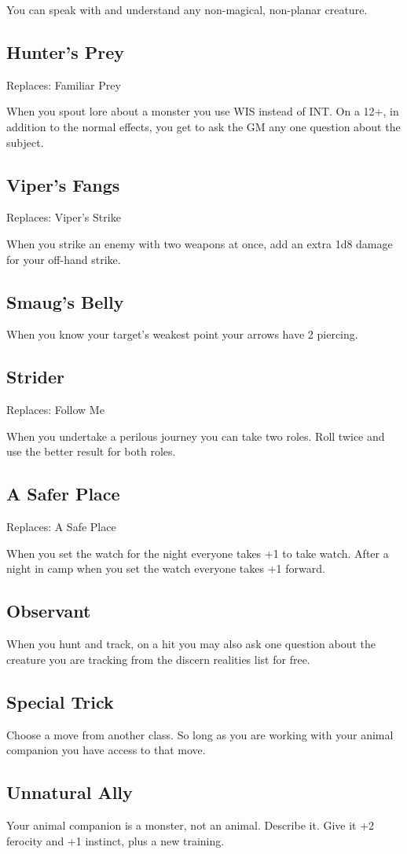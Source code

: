 You can speak with and understand any non-magical, non-planar creature.
\subsection{Hunter's Prey}

Replaces: Familiar Prey

When you spout lore about a monster you use WIS instead of INT\@. On a 12+, in addition to the normal effects, you get to ask the GM any one question about the subject.
\subsection{Viper's Fangs}

Replaces: Viper's Strike

When you strike an enemy with two weapons at once, add an extra 1d8 damage for your off-hand strike.
\subsection{Smaug's Belly}

When you know your target's weakest point your arrows have 2 piercing.
\subsection{Strider}

Replaces: Follow Me

When you undertake a perilous journey you can take two roles. Roll twice and use the better result for both roles.
\subsection{A Safer Place}

Replaces: A Safe Place

When you set the watch for the night everyone takes +1 to take watch. After a night in camp when you set the watch everyone takes +1 forward.
\subsection{Observant}

When you hunt and track, on a hit you may also ask one question about the creature you are tracking from the discern realities list for free.
\subsection{Special Trick}

Choose a move from another class. So long as you are working with your animal companion you have access to that move.
\subsection{Unnatural Ally}

Your animal companion is a monster, not an animal. Describe it. Give it +2 ferocity and +1 instinct, plus a new training.



